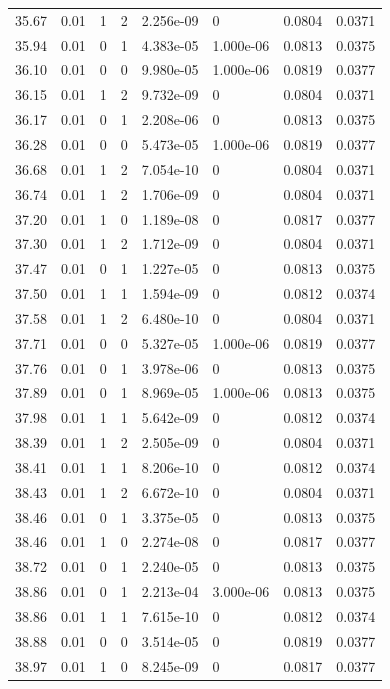 \documentclass[preview]{standalone}
\begin{document}
{{{{{\begin{tabular}{L{1.2cm}C{1.2cm} C{0.3cm}C{0.5cm} C{1.4cm}C{1.4cm} C{1.4cm}C{1.4cm}}
  35.67  &  0.01  & 1     &  2 &  2.256e-09  & 0  & 0.0804 &  0.0371   \\ 
  35.94  &  0.01  & 0     &  1 &  4.383e-05  & 1.000e-06  & 0.0813 &  0.0375   \\ 
  36.10  &  0.01  & 0     &  0 &  9.980e-05  & 1.000e-06  & 0.0819 &  0.0377   \\ 
  36.15  &  0.01  & 1     &  2 &  9.732e-09  & 0  & 0.0804 &  0.0371   \\ 
  36.17  &  0.01  & 0     &  1 &  2.208e-06  & 0  & 0.0813 &  0.0375   \\ 
  36.28  &  0.01  & 0     &  0 &  5.473e-05  & 1.000e-06  & 0.0819 &  0.0377   \\ 
  36.68  &  0.01  & 1     &  2 &  7.054e-10  & 0  & 0.0804 &  0.0371   \\ 
  36.74  &  0.01  & 1     &  2 &  1.706e-09  & 0  & 0.0804 &  0.0371   \\ 
  37.20  &  0.01  & 1     &  0 &  1.189e-08  & 0  & 0.0817 &  0.0377   \\ 
  37.30  &  0.01  & 1     &  2 &  1.712e-09  & 0  & 0.0804 &  0.0371   \\ 
  37.47  &  0.01  & 0     &  1 &  1.227e-05  & 0  & 0.0813 &  0.0375   \\ 
  37.50  &  0.01  & 1     &  1 &  1.594e-09  & 0  & 0.0812 &  0.0374   \\ 
  37.58  &  0.01  & 1     &  2 &  6.480e-10  & 0  & 0.0804 &  0.0371   \\ 
  37.71  &  0.01  & 0     &  0 &  5.327e-05  & 1.000e-06  & 0.0819 &  0.0377   \\ 
  37.76  &  0.01  & 0     &  1 &  3.978e-06  & 0  & 0.0813 &  0.0375   \\ 
  37.89  &  0.01  & 0     &  1 &  8.969e-05  & 1.000e-06  & 0.0813 &  0.0375   \\ 
  37.98  &  0.01  & 1     &  1 &  5.642e-09  & 0  & 0.0812 &  0.0374   \\ 
  38.39  &  0.01  & 1     &  2 &  2.505e-09  & 0  & 0.0804 &  0.0371   \\ 
  38.41  &  0.01  & 1     &  1 &  8.206e-10  & 0  & 0.0812 &  0.0374   \\ 
  38.43  &  0.01  & 1     &  2 &  6.672e-10  & 0  & 0.0804 &  0.0371   \\ 
  38.46  &  0.01  & 0     &  1 &  3.375e-05  & 0  & 0.0813 &  0.0375   \\ 
  38.46  &  0.01  & 1     &  0 &  2.274e-08  & 0  & 0.0817 &  0.0377   \\ 
  38.72  &  0.01  & 0     &  1 &  2.240e-05  & 0  & 0.0813 &  0.0375   \\ 
  38.86  &  0.01  & 0     &  1 &  2.213e-04  & 3.000e-06  & 0.0813 &  0.0375   \\ 
  38.86  &  0.01  & 1     &  1 &  7.615e-10  & 0  & 0.0812 &  0.0374   \\ 
  38.88  &  0.01  & 0     &  0 &  3.514e-05  & 0  & 0.0819 &  0.0377   \\ 
  38.97  &  0.01  & 1     &  0 &  8.245e-09  & 0  & 0.0817 &  0.0377   \\ 
\hline 
\end{tabular} 

}}}}}
\end{document}
